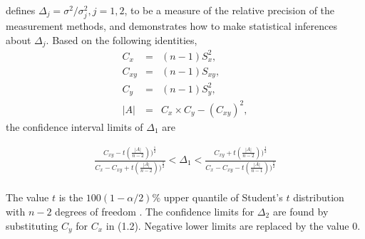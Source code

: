 \documentclass[12pt, a4paper]{report}
\theoremstyle{plain}
\theoremstyle{definition}
\theoremstyle{remark}
\begin{document}
	
	\citet{Thompson} defines $\Delta_j = \sigma^2 / \sigma^2_j, j=1,2$, to be a measure of the
	relative precision of the measurement methods, and demonstrates how to make statistical inferences about $\Delta_{j}$.
	Based on the following identities,
	\begin{eqnarray*}
		C_{x}&=&(n-1)S^2_{x},\nonumber\\
		C_{xy}&=&(n-1)S_{xy},\nonumber\\
		C_{y}&=&(n-1)S^2_{y},\nonumber\\
		|A| &=& C_{x}\times C_{y} - (C_{xy})^2,\nonumber
	\end{eqnarray*}
	\noindent the confidence interval limits of $\Delta_{1}$ are
	
	\begin{eqnarray}
		\frac{C_{xy}-
			t(\frac{|A|}{n-2}))^{\frac{1}{2}}}{C_{x}-C_{xy}+
			t(\frac{|A|}{n-2}))^{\frac{1}{2}}} <
		\Delta_{1} < \frac{C_{xy}+
			t(\frac{|A|}{n-2}))^{\frac{1}{2}}}{C_{x}-C_{xy}-
			t(\frac{|A|}{n-1}))^{\frac{1}{2}}} \nonumber
	\end{eqnarray}
	\\ The value $t$ is the $100(1-\alpha/2)\%$ upper quantile of
	Student's $t$ distribution with $n-2$ degrees of freedom
	\citep{Kinsella}. The confidence limits for $\Delta_{2}$ are found by substituting $C_{y}$ for $C_{x}$ in (1.2).
	Negative lower limits are replaced by the value $0$.
	
	
	
\end{document}
